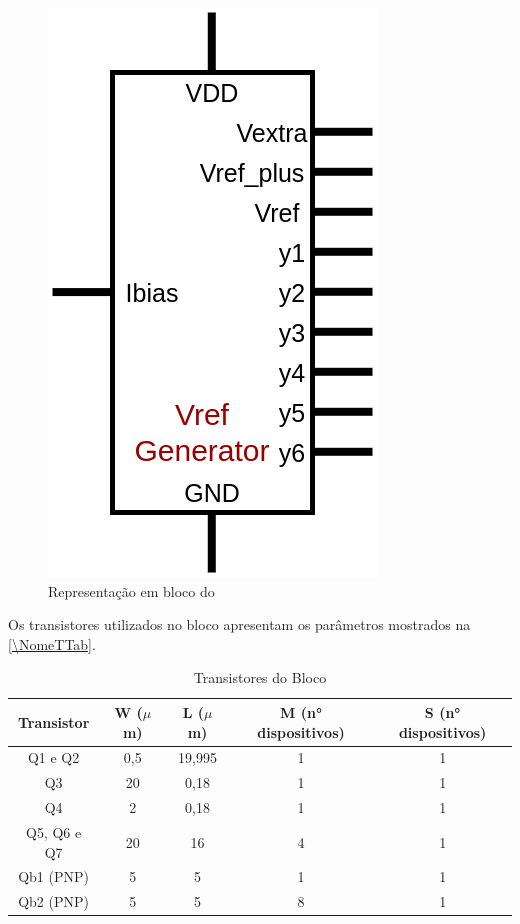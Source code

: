 \begin{figure}[htb]
 \centering
    \centering
    \caption{Representa{\c c}\~ao em bloco do \NomeBloco} \label{\NomeSFig}
    \includegraphics[scale=0.3]{Circuitos/vref_generator_block.png}
\end{figure}

Os transistores utilizados no bloco \NomeBloco{} apresentam os par\^ametros mostrados na \autoref{\NomeTTab}.

\begin{table}[htbp]
\caption{Transistores do Bloco \NomeBloco}
\label{\NomeTTab}
\centering
\begin{tabular}{ccccc}
\toprule
Transistor & W ($\mu$m)  & L ($\mu$m)           & M (n° dispositivos) & S (n° dispositivos)\\
\midrule \midrule
Q1 e Q2 & 0,5 & 19,995 & 1 & 1\\
\midrule
Q3 & 20 & 0,18 & 1 & 1\\
\midrule
Q4 & 2 & 0,18 & 1 & 1\\
\midrule
Q5, Q6 e Q7 & 20 & 16 & 4 & 1\\
\midrule
Qb1 (PNP) & 5 & 5 & 1 & 1\\
\midrule
Qb2 (PNP) & 5 & 5 & 8 & 1\\
\bottomrule
\end{tabular}
\end{table}

